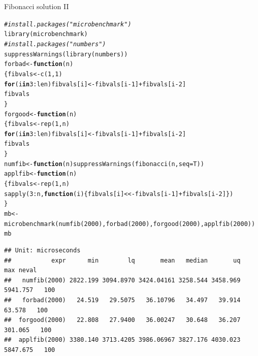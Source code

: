 \documentclass[xcolor=table,       handout,    xcolor=dvipsnames]{beamer}\usepackage[]{graphicx}\usepackage[]{color}
\makeatletter
\newcommand{\hlnum}[1]{\textcolor[rgb]{0,0,0}{#1}}
\newcommand{\hlcom}[1]{\textcolor[rgb]{0,0.392,0}{\textit{#1}}}
\newcommand{\hlopt}[1]{\textcolor[rgb]{0,0,0}{#1}}
\newcommand{\hlstd}[1]{\textcolor[rgb]{0,0,0}{#1}}
\newcommand{\hlkwa}[1]{\textcolor[rgb]{1,0,0}{\textbf{#1}}}
\newcommand{\hlkwb}[1]{\textcolor[rgb]{0,0,0}{#1}}
\newcommand{\hlkwc}[1]{\textcolor[rgb]{1,0,1}{#1}}
\newcommand{\hlkwd}[1]{\textcolor[rgb]{0,0,1}{#1}}
\newenvironment{kframe}{%
 \def\at@end@of@kframe{}%
 \ifinner\ifhmode%
  \def\at@end@of@kframe{\end{minipage}}%
  \begin{minipage}{\columnwidth}%
 \fi\fi%
 \def\FrameCommand##1{\hskip\@totalleftmargin \hskip-\fboxsep
 \colorbox{shadecolor}{##1}\hskip-\fboxsep
     \hskip-\linewidth \hskip-\@totalleftmargin \hskip\columnwidth}%
 \MakeFramed {\advance\hsize-\width
   \@totalleftmargin\z@ \linewidth\hsize
   \@setminipage}}%
 {\par\unskip\endMakeFramed%
 \at@end@of@kframe}
\newenvironment{knitrout}{}{} %
\makeatother
\begin{document}
\begin{frame}[fragile]{Fibonacci solution II}
\begin{knitrout}\tiny
{}\color{fgcolor}\begin{kframe}
\begin{alltt}
\hlcom{#install.packages("microbenchmark")}
\hlkwd{library}\hlstd{(microbenchmark)}
\hlcom{#install.packages("numbers")}
\hlkwd{suppressWarnings}\hlstd{(}\hlkwd{library}\hlstd{(numbers))}
\hlstd{forbad} \hlkwb{<-} \hlkwa{function}\hlstd{(}\hlkwc{n}\hlstd{)}
  \hlstd{\{fibvals} \hlkwb{<-} \hlkwd{c}\hlstd{(}\hlnum{1}\hlstd{,}\hlnum{1}\hlstd{)}
  \hlkwa{for} \hlstd{(i} \hlkwa{in} \hlnum{3}\hlopt{:}\hlstd{len) fibvals[i]} \hlkwb{<-} \hlstd{fibvals[i}\hlopt{-}\hlnum{1}\hlstd{]}\hlopt{+}\hlstd{fibvals[i}\hlopt{-}\hlnum{2}\hlstd{]}
  \hlstd{fibvals}
  \hlstd{\}}
\hlstd{forgood} \hlkwb{<-} \hlkwa{function}\hlstd{(}\hlkwc{n}\hlstd{)}
  \hlstd{\{fibvals} \hlkwb{<-} \hlkwd{rep}\hlstd{(}\hlnum{1}\hlstd{,n)}
  \hlkwa{for} \hlstd{(i} \hlkwa{in} \hlnum{3}\hlopt{:}\hlstd{len) fibvals[i]} \hlkwb{<-} \hlstd{fibvals[i}\hlopt{-}\hlnum{1}\hlstd{]}\hlopt{+}\hlstd{fibvals[i}\hlopt{-}\hlnum{2}\hlstd{]}
  \hlstd{fibvals}
  \hlstd{\}}
\hlstd{numfib} \hlkwb{<-} \hlkwa{function}\hlstd{(}\hlkwc{n}\hlstd{)} \hlkwd{suppressWarnings}\hlstd{(}\hlkwd{fibonacci}\hlstd{(n,} \hlkwc{seq}\hlstd{=T))}
\hlstd{applfib} \hlkwb{<-} \hlkwa{function}\hlstd{(}\hlkwc{n}\hlstd{)}
  \hlstd{\{fibvals} \hlkwb{<-} \hlkwd{rep}\hlstd{(}\hlnum{1}\hlstd{,n)}
  \hlkwd{sapply}\hlstd{(}\hlnum{3}\hlopt{:}\hlstd{n,} \hlkwa{function}\hlstd{(}\hlkwc{i}\hlstd{) \{fibvals[i]}\hlkwb{<<-}\hlstd{fibvals[i}\hlopt{-}\hlnum{1}\hlstd{]}\hlopt{+}\hlstd{fibvals[i}\hlopt{-}\hlnum{2}\hlstd{]\})}
  \hlstd{\}}
\hlstd{mb} \hlkwb{<-} \hlkwd{microbenchmark}\hlstd{(}\hlkwd{numfib}\hlstd{(}\hlnum{2000}\hlstd{),} \hlkwd{forbad}\hlstd{(}\hlnum{2000}\hlstd{),} \hlkwd{forgood}\hlstd{(}\hlnum{2000}\hlstd{),} \hlkwd{applfib}\hlstd{(}\hlnum{2000}\hlstd{))}
\hlstd{mb}
\end{alltt}
\begin{verbatim}
## Unit: microseconds
##           expr      min        lq       mean   median       uq      max neval
##   numfib(2000) 2822.199 3094.8970 3424.04161 3258.544 3458.969 5941.757   100
##   forbad(2000)   24.519   29.5075   36.10796   34.497   39.914   63.578   100
##  forgood(2000)   22.808   27.9400   36.00247   30.648   36.207  301.065   100
##  applfib(2000) 3380.140 3713.4205 3986.06967 3827.176 4030.023 5847.675   100
\end{verbatim}
\end{kframe}
\end{knitrout}

\end{frame}
\end{document}
